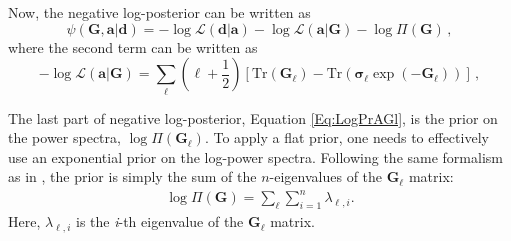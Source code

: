 \qquad Now, the negative log-posterior can be written as
\begin{equation}
    \psi(\mathbf{G}, \mathbf{a}|\bm{d}) = - \log\mathcal{L}(\bm{d}|\bm{a}) - \log\mathcal{L}(\bm{a}|\bm{G}) - \log\Pi(\bm{G})\, , 
\end{equation}
where the second term can be written as
\begin{equation}
\label{Eq:LogPrAGl}
-\log\mathcal{L}(\mathbf{a}|\mathbf{G})=\sum_{\ell}\left( {\ell}+\frac{1}{2}\right) \left[\mathrm{Tr}(\mathbf{\mathbf{G}}_{\ell}) -\mathrm{Tr}\left(\boldsymbol{\sigma}_{\ell}\exp(-\mathbf{\mathbf{G}}_{\ell})
 \right) \right]\, ,
\end{equation}

\qquad The last part of negative log-posterior, Equation \eqref{Eq:LogPrAGl}, is the prior on the power spectra, $\log\Pi(\bm{G}_{\ell})$. To apply a flat prior, one needs to effectively use an exponential prior on the log-power spectra. Following the same formalism as in \cite{Taylor2008,SreeThesis}, the prior is simply the sum of the $n$-eigenvalues of the $\mathbf{G}_{\ell}$ matrix:
\begin{align}
\label{Eq:LogPiorGl}
\log\Pi(\mathbf{G}) = \sum_{\ell}\sum_{i=1}^n\lambda_{\ell,i}.
\end{align}
Here, $\lambda_{{\ell},i}$ is the \textit{i}-th eigenvalue of the $\mathbf{G}_{\ell}$ matrix.

